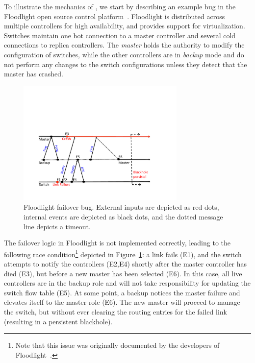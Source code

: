 To illustrate the mechanics of \simulator, we start by describing an example bug in the Floodlight
open source control platform~\cite{floodlight_bug}. Floodlight is distributed across
multiple controllers for high availability, and provides support for
virtualization. Switches maintain one hot connection to a master controller and
several cold connections to replica controllers. The \emph{master} holds the
authority to modify the configuration of switches, while the other
controllers are in \emph{backup} mode and do not perform any changes to the
switch configurations unless they detect that the master has crashed.

\begin{figure}[t]
    \includegraphics[width=3.25in]{../diagrams/case_study/example_bug.pdf}
    \caption[]{\label{fig:example} Floodlight failover bug. External inputs
               are depicted as red dots, internal events are depicted as black
               dots, and the dotted message line depicts a timeout.}
\end{figure}

The failover logic in Floodlight is not implemented correctly, leading to the
following race condition\footnote{Note that this issue was
originally documented by the developers of Floodlight~\cite{floodlight_bug}.} depicted in
Figure~\ref{fig:example}:
a link fails (E1), and the switch attempts to notify the controllers (E2,E4) shortly after the master
controller has died (E3), but before a new master has been selected (E6). In this case, all live controllers are in
the backup role and will not take responsibility for updating the switch
flow table (E5). At some point, a backup notices the master failure and
elevates itself to the master role (E6). The new master will proceed to manage
the switch, but without ever clearing the routing entries for
the failed link (resulting in a persistent blackhole).

